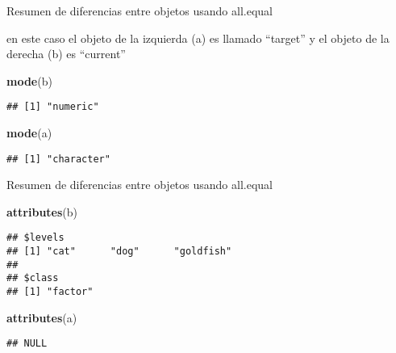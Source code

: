 \documentclass[ignorenonframetext,]{beamer}
\newenvironment{Shaded}{\begin{snugshade}}{\end{snugshade}}
\newcommand{\KeywordTok}[1]{\textcolor[rgb]{0.13,0.29,0.53}{\textbf{#1}}}
\newcommand{\NormalTok}[1]{#1}
\begin{document}
\begin{frame}[fragile]{Resumen de diferencias entre objetos usando
all.equal}

en este caso el objeto de la izquierda (a) es llamado ``target'' y el
objeto de la derecha (b) es ``current''

\begin{Shaded}
\begin{Highlighting}[]
\KeywordTok{mode}\NormalTok{(b)}
\end{Highlighting}
\end{Shaded}

\begin{verbatim}
## [1] "numeric"
\end{verbatim}

\begin{Shaded}
\begin{Highlighting}[]
\KeywordTok{mode}\NormalTok{(a)}
\end{Highlighting}
\end{Shaded}

\begin{verbatim}
## [1] "character"
\end{verbatim}

\end{frame}

\begin{frame}[fragile]{Resumen de diferencias entre objetos usando
all.equal}

\begin{Shaded}
\begin{Highlighting}[]
\KeywordTok{attributes}\NormalTok{(b)}
\end{Highlighting}
\end{Shaded}

\begin{verbatim}
## $levels
## [1] "cat"      "dog"      "goldfish"
## 
## $class
## [1] "factor"
\end{verbatim}

\begin{Shaded}
\begin{Highlighting}[]
\KeywordTok{attributes}\NormalTok{(a)}
\end{Highlighting}
\end{Shaded}

\begin{verbatim}
## NULL
\end{verbatim}

\end{frame}
\end{document}
